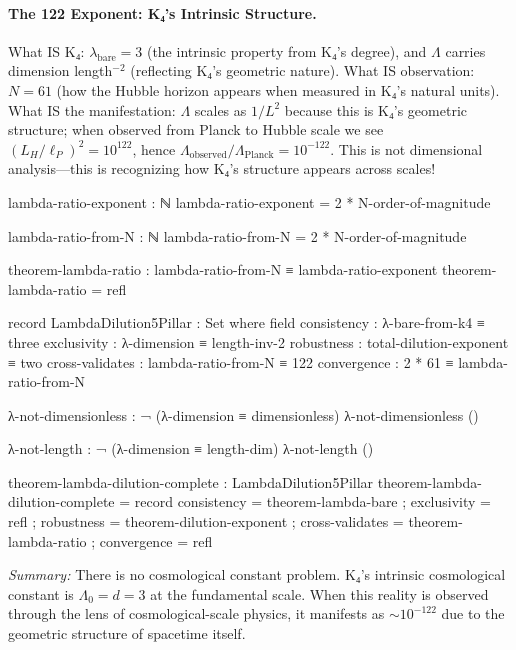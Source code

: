 \documentclass[11pt,a4paper]{book}
\begin{document}
\paragraph{The 122 Exponent: K₄'s Intrinsic Structure.}
What IS K₄: $\lambda_{\text{bare}} = 3$ (the intrinsic property from K₄'s degree), 
and $\Lambda$ carries dimension length$^{-2}$ (reflecting K₄'s geometric nature).
What IS observation: $N = 61$ (how the Hubble horizon appears when measured in K₄'s natural units).
What IS the manifestation: $\Lambda$ scales as $1/L^2$ because this is K₄'s geometric structure; when observed from Planck to Hubble scale we see 
$(L_H/\ell_P)^2 = 10^{122}$, hence $\Lambda_{\text{observed}}/\Lambda_{\text{Planck}} = 10^{-122}$.
This is not dimensional analysis—this is recognizing how K₄'s structure appears across scales!

\begin{code}
  lambda-ratio-exponent : ℕ
  lambda-ratio-exponent = 2 * N-order-of-magnitude
  
  lambda-ratio-from-N : ℕ
  lambda-ratio-from-N = 2 * N-order-of-magnitude
  
  theorem-lambda-ratio : lambda-ratio-from-N ≡ lambda-ratio-exponent
  theorem-lambda-ratio = refl
  
  record LambdaDilution5Pillar : Set where
    field
      consistency     : λ-bare-from-k4 ≡ three
      exclusivity     : λ-dimension ≡ length-inv-2
      robustness      : total-dilution-exponent ≡ two
      cross-validates : lambda-ratio-from-N ≡ 122
      convergence     : 2 * 61 ≡ lambda-ratio-from-N
  
  λ-not-dimensionless : ¬ (λ-dimension ≡ dimensionless)
  λ-not-dimensionless ()
  
  λ-not-length : ¬ (λ-dimension ≡ length-dim)
  λ-not-length ()
      
  theorem-lambda-dilution-complete : LambdaDilution5Pillar
  theorem-lambda-dilution-complete = record
    { consistency     = theorem-lambda-bare
    ; exclusivity     = refl
    ; robustness      = theorem-dilution-exponent
    ; cross-validates = theorem-lambda-ratio
    ; convergence     = refl
    }
\end{code}

\medskip
\noindent\textit{Summary:} There is no cosmological constant problem. K₄'s intrinsic cosmological constant is $\Lambda_0 = d = 3$ 
at the fundamental scale. When this reality is observed through the lens of cosmological-scale physics, it manifests as $\sim 10^{-122}$ due to the geometric structure of spacetime itself.
\end{document}

